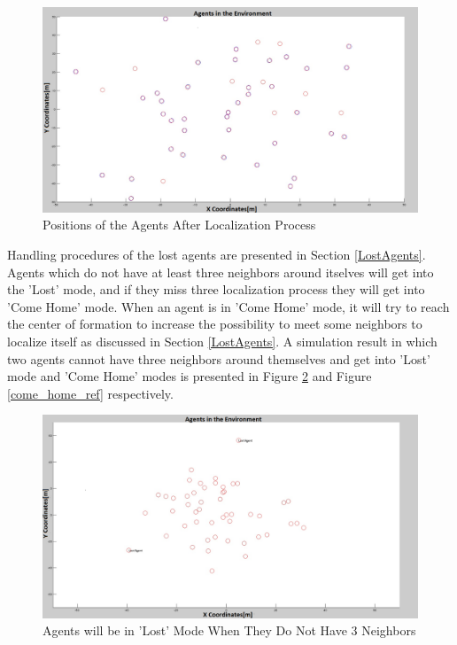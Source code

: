 \begin{figure}[H]
\centering
\captionsetup{format=hang,justification=centerfirst}
\caption{Positions of the Agents After Localization Process} \label{duzgun_pos_ref}
\centerline{\includegraphics[scale = 0.25]{Pozisyon-1-Duzeltilmis}}
\end{figure} 
		
Handling procedures of the lost agents are presented in Section \ref{LostAgents}. Agents which do not have at least three neighbors around itselves will get into the 'Lost' mode, and if  they miss three localization process they will get into 'Come Home' mode. When an agent is in 'Come Home' mode, it will try to reach the center of formation to increase the possibility to meet some neighbors to localize itself as discussed in Section \ref{LostAgents}. A simulation result in which two agents cannot have three neighbors around themselves and get into 'Lost' mode and 'Come Home' modes  is presented in Figure \ref{lost_ref} and Figure \ref{come_home_ref} respectively.
		
\begin{figure}[H]
\caption{Agents will be in 'Lost' Mode When They Do Not Have 3 Neighbors} \label{lost_ref}
\centering
\centerline{\includegraphics[scale = 0.25]{Lost-2-2}}
\end{figure} 

